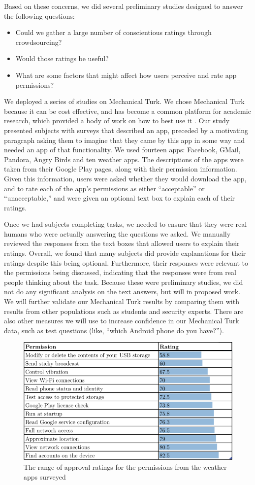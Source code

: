 \documentclass[11pt]{article}
\begin{document}
Based on these concerns, we did several preliminary studies designed to answer
the following questions:
\begin{itemize}
\item Could we gather a large number of conscientious ratings through crowdsourcing?
\item Would those ratings be useful?
\item What are some factors that might affect how users perceive and rate 
app permissions?
\end{itemize}
We deployed a series of studies on Mechanical Turk. We chose
Mechanical Turk because it can be cost effective, and has become
a common platform for academic research, which provided a body of work on how
to best use it \cite{reseach-mturk-BRM12, mturk-data-quality-PPS11}. 
Our study presented subjects with surveys that
described an app, preceded by a motivating paragraph asking
them to imagine that they came by this app in some way and needed an
app of that functionality.  We used fourteen apps: Facebook, GMail,
Pandora, Angry Birds and ten weather apps.  The descriptions
of the apps were taken from their Google Play pages, along with their
permission information. Given this information, users were asked
whether they would download the app, and to rate each of the app's
permissions as either ``acceptable'' or ``unacceptable,'' and were
given an optional text box to explain each of their ratings.

Once we had subjects completing tasks, we needed to ensure that they 
were real humans who were actually answering the questions we 
asked. We manually reviewed the responses from the text boxes
that allowed users to explain their ratings. Overall, we found that
many subjects did provide explanations for their ratings despite this being
optional. Furthermore, their responses were relevant to the
permissions being discussed, indicating that the responses were from
real people thinking about the task. Because these were preliminary
studies, we did not do any significant analysis on the text answers,
but will in proposed work. We will further
validate our Mechanical Turk results by comparing them with results
from other populations such as students and security experts. 
There are also other measures we will
use to increase confidence in our Mechanical Turk data, such as test
questions (like, ``which Android phone do you have?'').

\begin{figure}[t]
\centering
    \includegraphics[width=.6\linewidth]{img/RatingTable.png}
    \vspace{1pt}
    \caption{The range of approval ratings for the permissions from the 
    weather apps surveyed}
    \label{weatherratings}
\end{figure}
\end{document}

